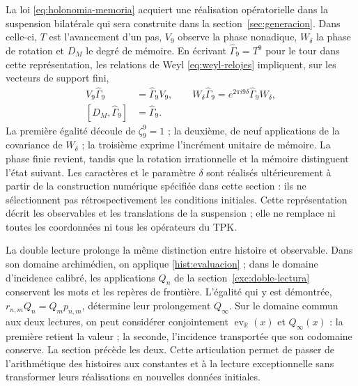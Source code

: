 La loi \eqref{eq:holonomia-memoria} acquiert une réalisation opératorielle
dans la suspension bilatérale qui sera construite dans la
section~\ref{sec:generacion}. Dans celle-ci, \(T\) est l’avancement d’un pas,
\(V_9\) observe la phase nonadique, \(W_\delta\) la phase de rotation et
\(D_M\) le degré de mémoire. En écrivant
\(\widehat\Gamma_9=T^9\) pour le tour dans cette représentation,
les relations de Weyl \eqref{eq:weyl-relojes} impliquent, sur les vecteurs
de support fini,
\begin{equation}
 \begin{aligned}
 V_9\widehat\Gamma_9&=\widehat\Gamma_9V_9,\qquad
 W_\delta\widehat\Gamma_9=e^{2\pi i9\delta}
     \widehat\Gamma_9W_\delta,\\
 [D_M,\widehat\Gamma_9]&=\widehat\Gamma_9.
 \end{aligned}
 \label{hist:tres-retornos}
\end{equation}
La première égalité découle de \(\zeta_9^9=1\) ; la deuxième, de neuf
applications de la covariance de \(W_\delta\) ; la troisième exprime
l’incrément unitaire de mémoire. La phase finie revient, tandis que la
rotation irrationnelle et la mémoire distinguent l’état suivant. Les
caractères et le paramètre \(\delta\) sont réalisés ultérieurement à partir de la
construction numérique spécifiée dans cette section : ils ne sélectionnent pas rétrospectivement
les conditions initiales. Cette représentation décrit les observables et les translations de
la suspension ; elle ne remplace ni toutes les coordonnées ni tous les opérateurs
du TPK.

La double lecture prolonge la même distinction entre histoire et observable.
Dans son domaine archimédien, on applique \eqref{hist:evaluacion} ; dans le
domaine d’incidence calibré, les applications \(Q_n\) de la
section~\ref{exc:doble-lectura} conservent les mots et les repères de
frontière. L’égalité qui y est démontrée,
\(r_{n,m}Q_n=Q_mp_{n,m}\), détermine leur prolongement \(Q_\infty\).
Sur le domaine commun aux deux lectures, on peut considérer conjointement
\(\operatorname{ev}_{\mathbb R}(x)\) et \(Q_\infty(x)\) : la
première retient la valeur ; la seconde, l’incidence transportée que son
codomaine conserve. La section précède les deux. Cette articulation permet
de passer de l’arithmétique des histoires aux constantes et à la lecture
exceptionnelle sans transformer leurs réalisations en nouvelles données initiales.
